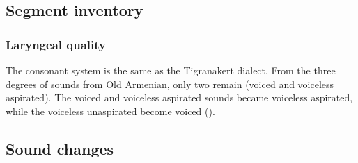 \subsection{Segment inventory}
\subsubsection{Laryngeal quality}\label{section:malatya:phono:inventory:laryngeal}

The consonant system is the same as the Tigranakert dialect. From the three degrees of sounds from Old Armenian, only two remain (voiced and voiceless aspirated). The voiced and voiceless aspirated sounds became voiceless aspirated, while the voiceless unaspirated become voiced ().




\begin{table}[H]
	\centering
	\caption{Laryngeal quality of stops and affricates in the Malatya dialect}
	\label{tab:Malatya:phono:cos:voicing}
\end{table}

\subsection{Sound changes}


